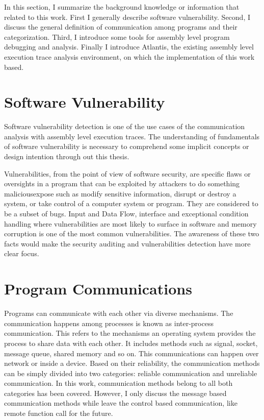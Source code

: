 \label{chapter:Bac}
In this section, I summarize the background knowledge or information that related to this work. First I generally describe software vulnerability. Second, I discuss the general definition of communication among programs and their categorization. Third, I introduce some tools for assembly level program debugging and analysis. Finally I introduce Atlantis, the existing assembly level execution trace analysis environment, on which the implementation of this work based.

\section{Software Vulnerability}
Software vulnerability detection is one of the use cases of the communication analysis with assembly level execution traces. The understanding of fundamentals of software vulnerability is necessary to comprehend some implicit concepts or design intention through out this thesis. 

Vulnerabilities, from the point of view of software security, are specific flaws or oversights in a program that can be exploited by attackers to do something maliciousexpose such as modify sensitive information, disrupt or destroy a system, or take control of a computer system or program. They are considered to be a subset of bugs. Input and Data Flow, interface and exceptional condition handling where vulnerabilities are most likely to surface in software and memory corruption is one of the most common vulnerabilities. The awareness of these two facts would make the security auditing and vulnerabilities detection have more clear focus. \cite{dowd_art_2006}

\section{Program Communications}
Programs can communicate with each other via diverse mechanisms. The communication happens among processes is known as inter-process communication. This refers to the mechanisms an operating system provides the process to share data with each other. It includes methods such as signal, socket, message queue, shared memory and so on.\cite{garrido2000inter} This communications can happen over network or inside a device. Based on their reliability, the communication methods can be simply divided into two categories: reliable communication and unreliable communication. In this work, communication methods belong to all both categories has been covered. However, I only discuss the message based communication methods while leave the control based communication, like remote function call for the future.

